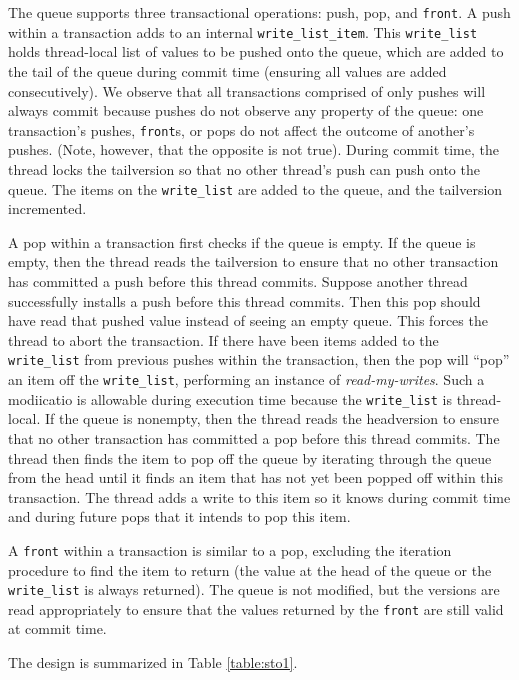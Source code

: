 The queue supports three transactional operations: push, pop, and \texttt{front}. A push within a transaction adds to an internal \texttt{write\_list\_item}. This \texttt{write\_list} holds thread-local list of values to be pushed onto the queue, which are added to the tail of the queue during commit time (ensuring all values are added consecutively). We observe that all transactions comprised of only pushes will always commit because pushes do not observe any property of the queue: one transaction's pushes, \texttt{front}s, or pops do not affect the outcome of another's pushes. (Note, however, that the opposite is not true). During commit time, the thread locks the tailversion so that no other thread's push can push onto the queue. The items on the \texttt{write\_list} are added to the queue, and the tailversion incremented.

A pop within a transaction first checks if the queue is empty. If the queue is empty, then the thread reads the tailversion to ensure that no other transaction has committed a push before this thread commits. Suppose another thread successfully installs a push before this thread commits. Then this pop should have read that pushed value instead of seeing an empty queue. This forces the thread to abort the transaction. If there have been items added to the \texttt{write\_list} from previous pushes within the transaction, then the pop will “pop” an item off the \texttt{write\_list}, performing an instance of \emph{read-my-writes}. Such a modiicatio is allowable during execution time because the \texttt{write\_list} is thread-local. If the queue is nonempty, then the thread reads the headversion to ensure that no other transaction has committed a pop before this thread commits. The thread then finds the item to pop off the queue by iterating through the queue from the head until it finds an item that has not yet been popped off within this transaction. The thread adds a write to this item so it knows during commit time and during future pops that it intends to pop this item.

A \texttt{front} within a transaction is similar to a pop, excluding the iteration procedure to find the item to return (the value at the head of the queue or the \texttt{write\_list} is always returned). The queue is not modified, but the versions are read appropriately to ensure that the values returned by the \texttt{front} are still valid at commit time.

The design is summarized in Table \ref{table:sto1}.

